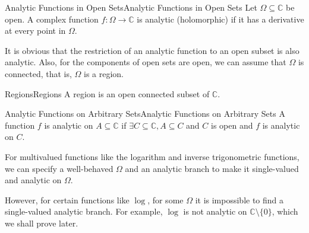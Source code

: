 \documentclass[../main.tex]{subfiles}
\begin{document}
\begin{definition}{Analytic Functions in Open Sets}{Analytic Functions in Open Sets}
Let $\Omega \subseteq \mathbb{C}$ be open. A complex function $f: \Omega\rightarrow \mathbb{C}$ is analytic (holomorphic) if it has a derivative at every point in $\Omega$.
\end{definition}

It is obvious that the restriction of an analytic function to an open subset is also analytic. Also, for the components of open sets are open, we can assume that $\Omega$ is connected, that is, $\Omega$ is a region.

\begin{definition}{Regions}{Regions}
	A region is an open connected subset of $\mathbb{C}$.
\end{definition}

\begin{definition}{Analytic Functions on Arbitrary Sets}{Analytic Functions on Arbitrary Sets}
A function $f$ is analytic on $A \subseteq \mathbb{C}$ if $\exists C \subseteq \mathbb{C},A \subseteq C$ and $C$ is open and $f$ is analytic on $C$.
\end{definition}

\begin{remark}
For multivalued functions like the logarithm and inverse trigonometric functions, we can specify a well-behaved $\Omega$ and an analytic branch to make it single-valued and analytic on $\Omega$.

However, for certain functions like  $\log $, for some $\Omega$ it is impossible to find a single-valued analytic branch. For example, $\log$ is not analytic on $\mathbb{C}\setminus\{0\}$, which we shall prove later.
\end{remark}
\end{document}
